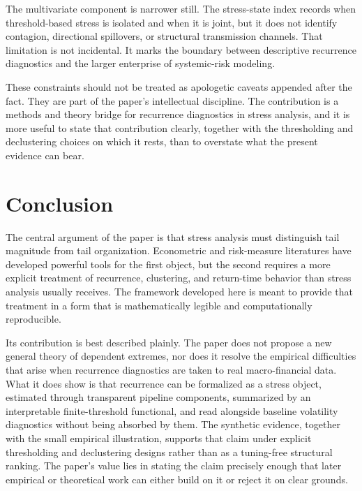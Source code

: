 \documentclass[11pt]{article}
\begin{document}
The multivariate component is narrower still. The stress-state index records when threshold-based stress is isolated and when it is joint, but it does not identify contagion, directional spillovers, or structural transmission channels. That limitation is not incidental. It marks the boundary between descriptive recurrence diagnostics and the larger enterprise of systemic-risk modeling.

These constraints should not be treated as apologetic caveats appended after the fact. They are part of the paper's intellectual discipline. The contribution is a methods and theory bridge for recurrence diagnostics in stress analysis, and it is more useful to state that contribution clearly, together with the thresholding and declustering choices on which it rests, than to overstate what the present evidence can bear.

\section{Conclusion}

The central argument of the paper is that stress analysis must distinguish tail magnitude from tail organization. Econometric and risk-measure literatures have developed powerful tools for the first object, but the second requires a more explicit treatment of recurrence, clustering, and return-time behavior than stress analysis usually receives. The framework developed here is meant to provide that treatment in a form that is mathematically legible and computationally reproducible.

Its contribution is best described plainly. The paper does not propose a new general theory of dependent extremes, nor does it resolve the empirical difficulties that arise when recurrence diagnostics are taken to real macro-financial data. What it does show is that recurrence can be formalized as a stress object, estimated through transparent pipeline components, summarized by an interpretable finite-threshold functional, and read alongside baseline volatility diagnostics without being absorbed by them. The synthetic evidence, together with the small empirical illustration, supports that claim under explicit thresholding and declustering designs rather than as a tuning-free structural ranking. The paper's value lies in stating the claim precisely enough that later empirical or theoretical work can either build on it or reject it on clear grounds.
\end{document}
